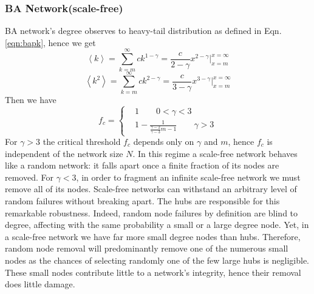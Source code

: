 \documentclass[11pt]{article}
\newcommand{\expbracket}[1]{\left \langle #1  \right \rangle}
\begin{document}
\subsubsection{BA Network(scale-free)}
BA network's degree observes to heavy-tail distribution as defined in Eqn. \ref{eqn:bapk}, hence we get 
\begin{equation}
    \expbracket{k} = \sum_{k=m}^\infty ck^{1-\gamma} = \frac{c}{2-\gamma} x^{2-\gamma} \bigg|_{x=m}^{x=\infty}  
\end{equation}
\begin{equation}
    \expbracket{k^2} = \sum_{k=m}^\infty ck^{2-\gamma} = \frac{c}{3-\gamma} x^{3-\gamma} \bigg|_{x=m}^{x=\infty}  
\end{equation}
Then we have 
\begin{equation}
    f_c = 
    \left\{
    \begin{array}{cc} 
         & 1 \qquad 0<\gamma<3 \\
         & 1 - \frac{1}{\frac{\gamma-2}{\gamma-3}m-1}  \qquad \gamma>3
    \end{array} \right.
\end{equation}
For $\gamma > 3$ the critical threshold $f_c$ depends only on $\gamma$ and $m$, hence $f_c$ is independent of the network size $N$. In this regime a scale-free network behaves like a random network: it falls apart once a finite fraction of its nodes are removed.
For $\gamma < 3$, in order to fragment an infinite scale-free network we must remove all of its nodes. Scale-free networks can withstand an arbitrary level of random failures without breaking apart. The hubs are responsible for this remarkable robustness. Indeed, random node failures by definition are blind to degree, affecting with the same probability a small or a large degree node. Yet, in a scale-free network we have far more small degree nodes than hubs. Therefore, random node removal will predominantly remove one of the numerous small nodes as the chances of selecting randomly one of the few large hubs is negligible. These small nodes contribute little to a network’s integrity, hence their removal does little damage.

\end{document}
